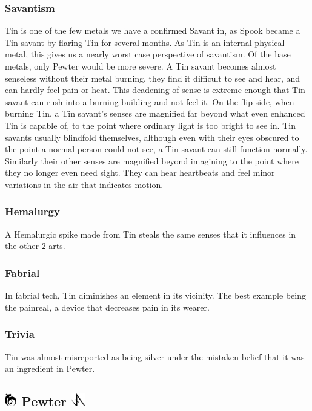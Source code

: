 \documentclass[conference]{IEEEtran}
\begin{document}
\subsubsection*{\textbf{Savantism}}
Tin is one of the few metals we have a confirmed Savant in, as Spook became a Tin savant by flaring Tin for several months.\cite{WoF}  As Tin is an internal physical metal, this gives us a nearly worst case perspective of savantism.  Of the base metals, only Pewter would be more severe.\cite{WoF}  A Tin savant becomes almost senseless without their metal burning, they find it difficult to see and hear, and can hardly feel pain or heat.\cite{HoA-CH56}  This deadening of sense is extreme enough that Tin savant can rush into a burning building and not feel it.\cite{HoA-CH58}  On the flip side, when burning Tin, a Tin savant's senses are magnified far beyond what even enhanced Tin is capable of, to the point where ordinary light is too bright to see in.\cite{HoA-CH16}  Tin savants usually blindfold themselves, although even with their eyes obscured to the point a normal person could not see, a Tin savant can still function normally.\cite{HoA-CH16}  Similarly their other senses are magnified beyond imagining to the point where they no longer even need sight.\cite{HoA-CH16}  They can hear heartbeats\cite{HoA-CH14} and feel minor variations in the air that indicates motion.\cite{HoA-CH41}\\
\subsubsection*{\textbf{Hemalurgy}}
A Hemalurgic spike made from Tin steals the same senses that it influences in the other 2 arts.\cite{HE-TB}\\
\subsubsection*{\textbf{Fabrial}}
In fabrial tech, Tin diminishes an element in its vicinity.  The best example being the painreal, a device that decreases pain in its wearer.\cite{RoW-E10}\\
\subsubsection*{\textbf{Trivia}}
Tin was almost misreported as being silver under the mistaken belief that it was an ingredient in Pewter.\cite{tin-trivia}

\subsection*{\includegraphics[height=1em]{images/Pewter.png}  \textbf{Pewter} \includegraphics[height=1em]{images/Pewter_(Feruchemy).png}}
\end{document}

